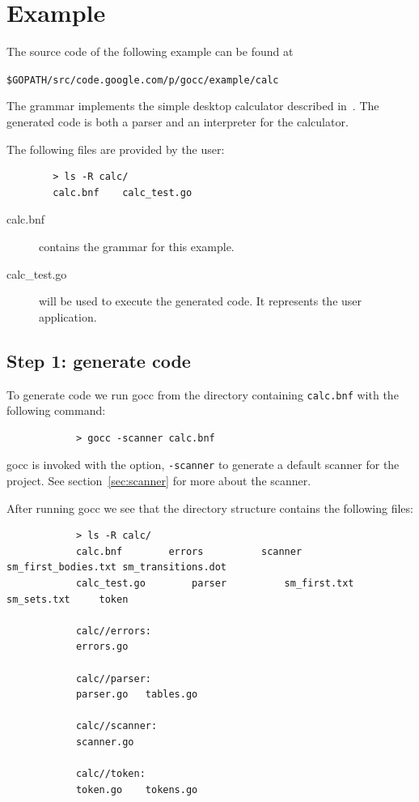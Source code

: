 \documentclass[12pt]{article}
\begin{document}
\section{Example}
	The source code of the following example can be found at 

	\verb|$GOPATH/src/code.google.com/p/gocc/example/calc| 

	The grammar implements the simple desktop calculator described in~\cite{Dragon Book}. The generated code is both a parser and an interpreter for the calculator.

	The following files are provided by the user:
	\begin{verbatim}
		> ls -R calc/
		calc.bnf	calc_test.go	
	\end{verbatim}

	\begin{description}
		\item[calc.bnf] contains the grammar for this example.

		\item[calc\_test.go] will be used to execute the generated code. It represents the user application.

	\end{description}

	\subsection{Step 1: generate code}
		To generate code we run gocc from the directory containing \verb|calc.bnf| with the following command:

		\begin{verbatim}
			> gocc -scanner calc.bnf
		\end{verbatim}

		gocc is invoked with the option, \verb|-scanner| to generate a default scanner for the project. See section~\ref{sec:scanner} for more about the scanner.

		After running gocc we see that the directory structure contains the following files:

		\begin{verbatim}
			> ls -R calc/
			calc.bnf		errors			scanner			sm_first_bodies.txt	sm_transitions.dot
			calc_test.go		parser			sm_first.txt		sm_sets.txt		token

			calc//errors:
			errors.go

			calc//parser:
			parser.go	tables.go

			calc//scanner:
			scanner.go

			calc//token:
			token.go	tokens.go
		\end{verbatim}
\end{document}
